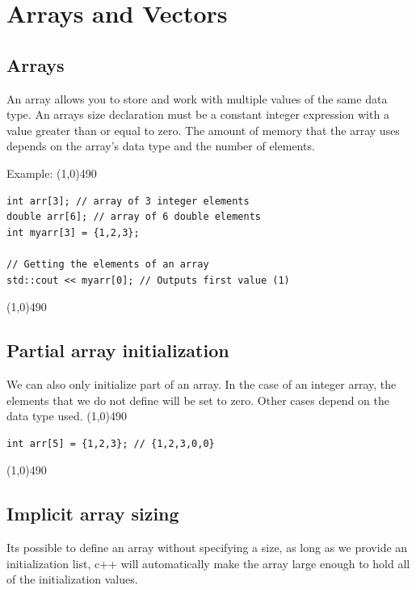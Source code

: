 \documentclass{report}
\begin{document}
    \section{\LARGE Arrays and Vectors}
    \bigbreak \noindent 
    \subsection{Arrays}
    \bigbreak \noindent 
    \begin{concept}
 An array allows you to store and work with multiple values of the same data type. An arrays size declaration must be a constant integer expression with a value greater than or equal to zero. The amount of memory that the array uses depends on the array's data type and the number of elements.
	\end{concept}
    \bigbreak \noindent 
    Example:
    \bigbreak \noindent 
    \line(1,0){490}
    \begin{verbatim}
int arr[3]; // array of 3 integer elements
double arr[6]; // array of 6 double elements
int myarr[3] = {1,2,3};

// Getting the elements of an array
std::cout << myarr[0]; // Outputs first value (1)
    \end{verbatim}
    \line(1,0){490}
    \bigbreak \noindent 
    \bigbreak \noindent 

   \bigbreak \noindent 
   \subsection{Partial array initialization}
   \bigbreak \noindent 
   We can also only initialize part of an array. In the case of an integer array, the elements that we do not define will be set to zero. Other cases depend on the data type used.
   \bigbreak \noindent 
   \line(1,0){490}
   \begin{verbatim}
int arr[5] = {1,2,3}; // {1,2,3,0,0}
   \end{verbatim}
   \line(1,0){490}

   \bigbreak \noindent 
   \subsection{Implicit array sizing}
   \bigbreak \noindent 
   Its possible to define an array without specifying a size, as long as we provide an initialization list, c++ will automatically make the array large enough to hold all of the initialization values.
\end{document}
